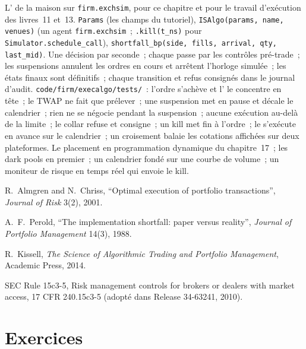 \begin{build}
 L' de la maison sur \texttt{firm.exchsim}, pour ce chapitre et pour le travail d'exécution des livres~11 et~13.
 \texttt{Params} (les champs du tutoriel), \texttt{ISAlgo(params, name, venues)} (un agent \texttt{firm.exchsim}~; \texttt{.kill(t\_ns)} pour
\texttt{Simulator.schedule\_call}), \texttt{shortfall\_bp(side, fills, arrival, qty, last\_mid)}.
 Une décision par seconde~; chaque  passe par les contrôles pré-trade~; les suspensions annulent les ordres en cours et arrêtent l'horloge simulée~; les états finaux sont définitifs~; chaque
transition et refus consignés dans le journal d'audit.
 \texttt{code/firm/execalgo/tests/}~: l'ordre s'achève et l' le concentre en tête~; le TWAP ne fait que prélever~; une suspension met en pause et décale
le calendrier~; rien ne se négocie pendant la suspension~; aucune exécution au-delà de la limite~; le collar refuse et consigne~; un kill met fin à l'ordre~; le 
s'exécute en avance sur le calendrier~; un croisement balaie les cotations affichées sur deux plateformes.
 Le placement en programmation dynamique du chapitre~17~; les dark pools en premier~; un calendrier fondé sur une courbe de volume~; un moniteur de risque en temps réel qui envoie le kill.
\end{build}

\begin{omsources}
\item R.~Almgren and N.~Chriss, ``Optimal execution of portfolio transactions'', \emph{Journal of Risk} 3(2), 2001.
\item A.~F.~Perold, ``The implementation shortfall: paper versus reality'', \emph{Journal of Portfolio Management} 14(3), 1988.
\item R.~Kissell, \emph{The Science of Algorithmic Trading and Portfolio Management}, Academic Press, 2014.
\item SEC Rule 15c3-5, Risk management controls for brokers or dealers with market access, 17 CFR 240.15c3-5 (adopté dans Release 34-63241, 2010).
\end{omsources}

\section{Exercices}

